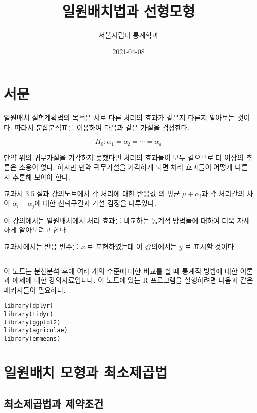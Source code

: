 \documentclass[
]{book}
\title{일원배치법과 선형모형}
\author{서울시립대 통계학과}
\date{2021-04-08}
\makeatletter
\newenvironment{kframe}{%
\medskip{}
\setlength{\fboxsep}{.8em}
 \def\at@end@of@kframe{}%
 \ifinner\ifhmode%
  \def\at@end@of@kframe{\end{minipage}}%
  \begin{minipage}{\columnwidth}%
 \fi\fi%
 \def\FrameCommand##1{\hskip\@totalleftmargin \hskip-\fboxsep
 \colorbox{shadecolor}{##1}\hskip-\fboxsep
     \hskip-\linewidth \hskip-\@totalleftmargin \hskip\columnwidth}%
 \MakeFramed {\advance\hsize-\width
   \@totalleftmargin\z@ \linewidth\hsize
   \@setminipage}}%
 {\par\unskip\endMakeFramed%
 \at@end@of@kframe}
\newenvironment{rmdblock}[1]
  {
  \begin{itemize}
  \renewcommand{\labelitemi}{
    \raisebox{-.7\height}[0pt][0pt]{
      {\setkeys{Gin}{width=3em,keepaspectratio}\texttt{[image: images/\#1]}}
    }
  }
  \setlength{\fboxsep}{1em}
  \begin{kframe}
  \item
  }
  {
  \end{kframe}
  \end{itemize}
  }
\newenvironment{rmdcaution}
  {\begin{rmdblock}{caution}}
  {\end{rmdblock}}
\makeatother
\begin{document}
\maketitle

{
\setcounter{tocdepth}{1}
\tableofcontents
}
\hypertarget{uxc11cuxbb38}{%
\chapter*{서문}\label{uxc11cuxbb38}}


일원배치 실험계획법의 목적은 서로 다른 처리의 효과가 같은지 다른지 알아보는 것이다. 따라서 분삽분석표를 이용하여 다음과 같은 가설을 검정한다.

\[ H_0 : \alpha_1 = \alpha_2 = \cdots = \alpha_a \]

만약 위의 귀무가설을 기각하지 못했다면 처리의 효과들이 모두 같으므로 더 이상의 추론은 소용이 없다.
하지만 만약 귀무가설을 기각하게 되면 처리 효과들이 어떻게 다른지 추론해 보아야 한다.

교과서 3.5 절과 강의노트에서 각 처리에 대한 반응값 의 평균 \(\mu+\alpha_i\)과 각 처리간의 차이 \(\alpha_i - \alpha_j\)에 대한 신뢰구간과 가설 검정을 다루었다.

이 강의에서는 일원배치에서 처리 효과를 비교하는 통계적 방법들에 대하여 더욱 자세하게 알아보려고 한다.

\begin{rmdcaution}
교과서에서는 반응 변수를 \(x\) 로 표현하였는데 이 강의에서는 \(y\) 로 표시할 것이다.
\end{rmdcaution}

\begin{center}\rule{0.5\linewidth}{0.5pt}\end{center}

이 노트는 분산분석 후에 여러 개의 수준에 대한 비교를 할 때 통계적 방법에 대한 이론과 예제에 대한 강의자료입니다.
이 노트에 있는 R 프로그램을 실행하려면 다음과 같은 패키지들이 필요하다.

\begin{verbatim}
library(dplyr)
library(tidyr)
library(ggplot2)
library(agricolae)
library(emmeans)
\end{verbatim}

\mainmatter

\hypertarget{onewaylse}{%
\chapter{일원배치 모형과 최소제곱법}\label{onewaylse}}

\hypertarget{uxcd5cuxc18cuxc81cuxacf1uxbc95uxacfc-uxc81cuxc57duxc870uxac74}{%
\section{최소제곱법과 제약조건}\label{uxcd5cuxc18cuxc81cuxacf1uxbc95uxacfc-uxc81cuxc57duxc870uxac74}}
\end{document}
